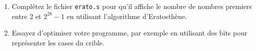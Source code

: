 \documentclass{article}
\begin{document}
\begin{exercise}
  \-
  \begin{enumerate}
  \item
    Complétez le fichier \verb!erato.s! pour qu'il affiche le nombre de nombres premiers entre
    2 et $2^{28} - 1$ en utilisant l'algorithme d'Eratosthène.

  \item
    Essayez d'optimiser votre programme, par exemple en utilisant des bits pour représenter les
    cases du crible.
  \end{enumerate}
\end{exercise}
\end{document}
